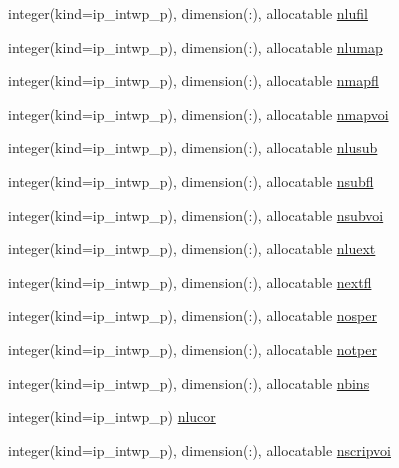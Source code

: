 \begin{DoxyCompactItemize}
integer(kind=ip\+\_\+intwp\+\_\+p), dimension(\+:), allocatable \hyperlink{namespacemod__oasis__namcouple_a31f62f64cbcf344e529d0576386d0751}{nlufil}
\item 
integer(kind=ip\+\_\+intwp\+\_\+p), dimension(\+:), allocatable \hyperlink{namespacemod__oasis__namcouple_a42367b4984c6ac4c69cbdcd315cb54e6}{nlumap}
\item 
integer(kind=ip\+\_\+intwp\+\_\+p), dimension(\+:), allocatable \hyperlink{namespacemod__oasis__namcouple_ac623e3e0906f57983efc1ab912ce9674}{nmapfl}
\item 
integer(kind=ip\+\_\+intwp\+\_\+p), dimension(\+:), allocatable \hyperlink{namespacemod__oasis__namcouple_adb1f8ce6bf94f488c10ef36b3afb8eca}{nmapvoi}
\item 
integer(kind=ip\+\_\+intwp\+\_\+p), dimension(\+:), allocatable \hyperlink{namespacemod__oasis__namcouple_aefed5eaa9924d249e979a5a772a46979}{nlusub}
\item 
integer(kind=ip\+\_\+intwp\+\_\+p), dimension(\+:), allocatable \hyperlink{namespacemod__oasis__namcouple_a6a94577996b440c31cac5b7d39e7f47a}{nsubfl}
\item 
integer(kind=ip\+\_\+intwp\+\_\+p), dimension(\+:), allocatable \hyperlink{namespacemod__oasis__namcouple_a0f31605257bfe125aafb6488a5065d4d}{nsubvoi}
\item 
integer(kind=ip\+\_\+intwp\+\_\+p), dimension(\+:), allocatable \hyperlink{namespacemod__oasis__namcouple_a7510ecfe3d0f141252450e4ba66209ba}{nluext}
\item 
integer(kind=ip\+\_\+intwp\+\_\+p), dimension(\+:), allocatable \hyperlink{namespacemod__oasis__namcouple_a8302411d5a02efd9a6dc7f784fbb0d4d}{nextfl}
\item 
integer(kind=ip\+\_\+intwp\+\_\+p), dimension(\+:), allocatable \hyperlink{namespacemod__oasis__namcouple_a484a71c213c89416924a0e23cfd46269}{nosper}
\item 
integer(kind=ip\+\_\+intwp\+\_\+p), dimension(\+:), allocatable \hyperlink{namespacemod__oasis__namcouple_ac154fc90756832bc90d02ea21f7c7e17}{notper}
\item 
integer(kind=ip\+\_\+intwp\+\_\+p), dimension(\+:), allocatable \hyperlink{namespacemod__oasis__namcouple_a4c609c48a20205e1d2aa9938d7babc92}{nbins}
\item 
integer(kind=ip\+\_\+intwp\+\_\+p) \hyperlink{namespacemod__oasis__namcouple_aee9f6849ec644ee40f465976bc6c7b96}{nlucor}
\item 
integer(kind=ip\+\_\+intwp\+\_\+p), dimension(\+:), allocatable \hyperlink{namespacemod__oasis__namcouple_abb6f67bfba2cba424dabee3a465fdfd5}{nscripvoi}

\end{DoxyCompactItemize}
